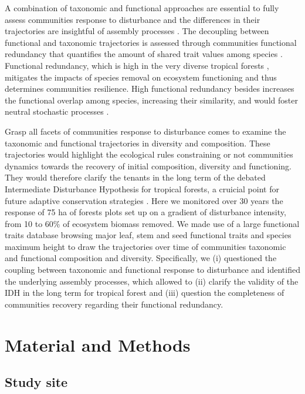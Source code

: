 \documentclass[fleqn,10pt]{ArtEcoFoG} %
\theoremstyle{definition}
\theoremstyle{definition}
\theoremstyle{definition}
\theoremstyle{remark}
\begin{document}
A combination of taxonomic and functional approaches are essential to
fully assess communities response to disturbance and the differences in
their trajectories are insightful of assembly processes
\citep{Lohbeck2015, Guariguata2001}. The decoupling between functional
and taxonomic trajectories is assessed through communities functional
redundancy that quantifies the amount of shared trait values among
species \citep{Carmona2016}. Functional redundancy, which is high in the
very diverse tropical forests \citep{Bellwood2006}, mitigates the
impacts of species removal on ecosystem functioning
\citep{Trenbath1999, Elmqvist2003, Diaz2005} and thus determines
communities resilience. High functional redundancy besides increases the
functional overlap among species, increasing their similarity, and would
foster neutral stochastic processes \citep{Gravel2006}.

Grasp all facets of communities response to disturbance comes to examine
the taxonomic and functional trajectories in diversity and composition.
These trajectories would highlight the ecological rules constraining or
not communities dynamics towards the recovery of initial composition,
diversity and functioning. They would therefore clarify the tenants in
the long term of the debated Intermediate Disturbance Hypothesis for
tropical forests, a cruicial point for future adaptive conservation
strategies \citep{Adler2007}. Here we monitored over 30 years the
response of 75 ha of forests plots set up on a gradient of disturbance
intensity, from 10 to 60\% of ecosystem biomass removed. We made use of
a large functional traits database browsing major leaf, stem and seed
functional traits and species maximum height to draw the trajectories
over time of communities taxonomic and functional composition and
diversity. Specifically, we (i) questioned the coupling between
taxonomic and functional response to disturbance and identified the
underlying assembly processes, which allowed to (ii) clarify the
validity of the IDH in the long term for tropical forest and (iii)
question the completeness of communities recovery regarding their
functional redundancy.

\section{Material and Methods}\label{material-and-methods}

\subsection{Study site}\label{study-site}
\end{document}
